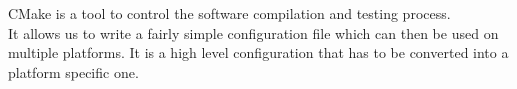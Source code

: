 CMake is a tool to control the software compilation and testing process. \cite{cmake} \\
It allows us to write a fairly simple configuration file which can then be used on multiple platforms.
It is a high level configuration that has to be converted into a platform specific one.

